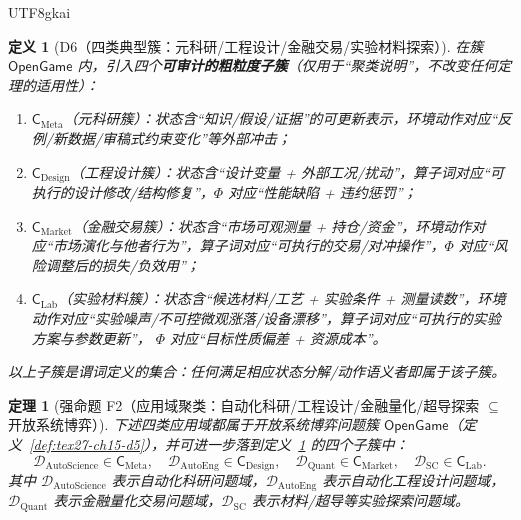 \documentclass[12pt]{article}
\newtheorem{definition}{定义}[section]
\newtheorem{theorem}{定理}[section]
\begin{document}
\begin{CJK*}{UTF8}{gkai}
\begin{definition}[D6（四类典型簇：元科研/工程设计/金融交易/实验材料探索）]
\label{def:tex27-ch15-d6}
在簇 $\mathsf{OpenGame}$ 内，引入四个\textbf{可审计的粗粒度子簇}（仅用于“聚类说明”，不改变任何定理的适用性）：
\begin{enumerate}
  \item $\mathsf{C}_{\mathrm{Meta}}$（元科研簇）：状态含“知识/假设/证据”的可更新表示，环境动作对应“反例/新数据/审稿式约束变化”等外部冲击；
  \item $\mathsf{C}_{\mathrm{Design}}$（工程设计簇）：状态含“设计变量 + 外部工况/扰动”，算子词对应“可执行的设计修改/结构修复”，$\Phi$ 对应“性能缺陷 + 违约惩罚”；
  \item $\mathsf{C}_{\mathrm{Market}}$（金融交易簇）：状态含“市场可观测量 + 持仓/资金”，环境动作对应“市场演化与他者行为”，算子词对应“可执行的交易/对冲操作”，$\Phi$
    对应“风险调整后的损失/负效用”；
  \item $\mathsf{C}_{\mathrm{Lab}}$（实验材料簇）：状态含“候选材料/工艺 + 实验条件 + 测量读数”，环境动作对应“实验噪声/不可控微观涨落/设备漂移”，算子词对应“可执行的实验方案与参数更新”，
    $\Phi$ 对应“目标性质偏差 + 资源成本”。
\end{enumerate}
以上子簇是谓词定义的集合：任何满足相应状态分解/动作语义者即属于该子簇。
\end{definition}

\begin{theorem}[强命题 F2（应用域聚类：自动化科研/工程设计/金融量化/超导探索 $\subseteq$ 开放系统博弈）]
\label{thm:tex27-ch15-f2}
下述四类应用域都属于开放系统博弈问题簇 $\mathsf{OpenGame}$（定义~\ref{def:tex27-ch15-d5}），并可进一步落到定义~\ref{def:tex27-ch15-d6} 的四个子簇中：
\[
  \mathcal{D}_{\mathrm{AutoScience}}\in\mathsf{C}_{\mathrm{Meta}},\quad
  \mathcal{D}_{\mathrm{AutoEng}}\in\mathsf{C}_{\mathrm{Design}},\quad
  \mathcal{D}_{\mathrm{Quant}}\in\mathsf{C}_{\mathrm{Market}},\quad
  \mathcal{D}_{\mathrm{SC}}\in\mathsf{C}_{\mathrm{Lab}}.
\]
其中 $\mathcal{D}_{\mathrm{AutoScience}}$ 表示自动化科研问题域，$\mathcal{D}_{\mathrm{AutoEng}}$ 表示自动化工程设计问题域，
$\mathcal{D}_{\mathrm{Quant}}$ 表示金融量化交易问题域，$\mathcal{D}_{\mathrm{SC}}$ 表示材料/超导等实验探索问题域。
\end{theorem}


\end{CJK*}
\end{document}
